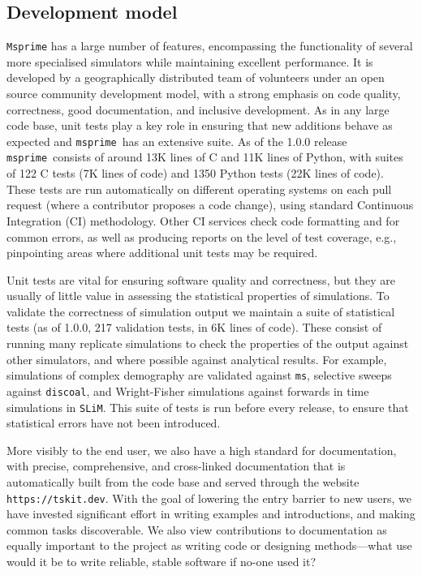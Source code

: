\documentclass{article}
\newcommand{\msprime}[0]{\texttt{msprime}}
\newcommand{\ms}[0]{\texttt{ms}}
\newcommand{\SLiM}[0]{\texttt{SLiM}}
\newcommand{\discoal}[0]{\texttt{discoal}}
\begin{document}
\subsection*{Development model}
\texttt{Msprime} has a large number of features, encompassing
the functionality of several more specialised simulators
while maintaining excellent performance.
It is developed by a geographically distributed team of volunteers under an
open source community development model, with a strong emphasis
on code quality, correctness, good documentation, and inclusive development.
As in any large code base,
unit tests play a key role in ensuring that new additions behave
as expected and \msprime\ has an extensive suite.
As of the 1.0.0 release \msprime\ consists of around 13K lines of C and 11K
lines of Python, with suites of 122 C tests (7K lines of code) and
1350 Python tests (22K lines of code). These tests are run
automatically on different operating systems on each pull request
(where a contributor proposes a code change), using standard Continuous
Integration (CI) methodology. Other CI services check code formatting
and for common errors, as well as producing reports on the level of
test coverage, e.g., pinpointing areas where additional unit tests may
be required.

Unit tests are vital for ensuring software quality and correctness, but
they are usually of little value in assessing the statistical properties
of simulations. To validate the correctness of simulation output
we maintain a suite of statistical tests (as of 1.0.0,
217 validation tests, in 6K lines of code). These consist of running many
replicate simulations to check the properties of the output
against other simulators, and where possible against analytical results.
For example, simulations of complex demography are validated against \ms,
selective sweeps against \discoal, and Wright-Fisher simulations
against forwards in time simulations in \SLiM.
This suite of tests is run before every release, to ensure
that statistical errors have not been introduced.

More visibly to the end user, we also have a high standard for documentation,
with precise, comprehensive, and cross-linked documentation
that is automatically built from the code base
and served through the website \texttt{https://tskit.dev}.
With the goal of lowering the entry barrier to new users,
we have invested significant effort in writing examples and introductions,
and making common tasks discoverable.
We also view contributions to documentation as equally important to the project
as writing code or designing methods---what use would it be
to write reliable, stable software if no-one used it?
\end{document}
